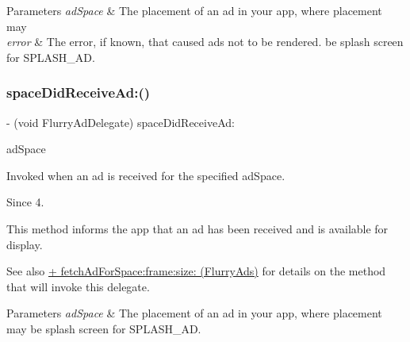 \begin{DoxyParams}{Parameters}
{\em ad\+Space} & The placement of an ad in your app, where placement may \\
\hline
{\em error} & The error, if known, that caused ads not to be rendered. be splash screen for S\+P\+L\+A\+S\+H\+\_\+\+AD. \\
\hline
\end{DoxyParams}
\mbox{\label{protocolFlurryAdDelegate_01-p_a92196ccfbcf5263cfc54554c676a39ae}} 
\subsubsection{\texorpdfstring{space\+Did\+Receive\+Ad\+:()}{spaceDidReceiveAd:()}}
{\footnotesize\ttfamily -\/ (void Flurry\+Ad\+Delegate) space\+Did\+Receive\+Ad\+: \begin{DoxyParamCaption}\item[{(N\+S\+String $\ast$)}]{ad\+Space }\end{DoxyParamCaption}\hspace{0.3cm}{\ttfamily [optional]}}



Invoked when an ad is received for the specified {\ttfamily ad\+Space}. 

\begin{DoxySince}{Since}
4.
\end{DoxySince}
This method informs the app that an ad has been received and is available for display.

\begin{DoxySeeAlso}{See also}
\hyperlink{interfaceFlurryAds_a7eb674e15673f908467be52017169368}{+ fetch\+Ad\+For\+Space\+:frame\+:size\+: (\+Flurry\+Ads)} for details on the method that will invoke this delegate.
\end{DoxySeeAlso}

\begin{DoxyParams}{Parameters}
{\em ad\+Space} & The placement of an ad in your app, where placement may be splash screen for S\+P\+L\+A\+S\+H\+\_\+\+AD. \\
\hline
\end{DoxyParams}
\mbox{\label{protocolFlurryAdDelegate_01-p_a9d972858b15ed8102d1675fc96bbd97c}} 
